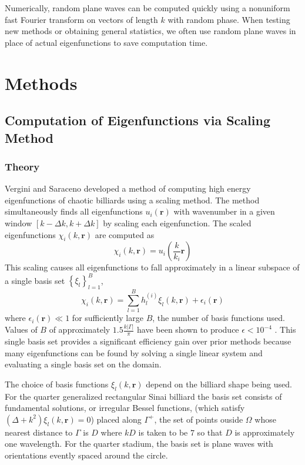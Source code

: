 \documentclass{report}
\newcommand{\rr}[0]{\mathbf{r}}
\begin{document}
Numerically, random plane waves can be computed quickly using a nonuniform fast Fourier transform on vectors of length $k$ with random phase. When testing new methods or obtaining general statistics, we often use random plane waves in place of actual eigenfunctions to save computation time.

\chapter{Methods}
\section{Computation of Eigenfunctions via Scaling Method}
\label{sec:scaling_method}
\subsection{Theory}
Vergini and Saraceno \cite{vergini} developed a method of computing high energy eigenfunctions of chaotic billiards using a scaling method. The method simultaneously finds all eigenfunctions $u_{i}(\rr)$ with wavenumber in a given window $[k - \Delta k, k + \Delta k]$ by scaling each eigenfunction. The scaled eigenfunctions $\chi_{i}(k, \rr)$ are computed as
\[
\chi_{i}(k, \rr) = u_{i} \left( \frac{k}{k_{i}} \rr \right)
\]
This scaling causes all eigenfunctions to fall approximately in a linear subspace of a single basis set $\left\{ \xi_{l} \right\}_{l=1}^{B}$,
\[
\chi_{i}(k, \rr) = \sum_{l=1}^{B} h_{l}^{(i)} \xi_{l}(k, \rr) + \epsilon_{i}(\rr)
\]
where $\epsilon_{i}(\rr) \ll 1$ for sufficiently large $B$, the number of basis functions used. Values of $B$ of approximately $1.5 \frac{k \vert \Gamma \vert}{\pi}$ have been shown to produce $\epsilon < 10^{-4}$ \cite{barnett_hassell}. This single basis set provides a significant efficiency gain over prior methods because many eigenfunctions can be found by solving a single linear system and evaluating a single basis set on the domain.

The choice of basis functions $\xi_{l}(k, \rr)$ depend on the billiard shape being used. For the quarter generalized rectangular Sinai billiard the basis set consists of fundamental solutions, or irregular Bessel functions, (which satisfy $(\Delta + k^2)\xi_{l}(k, \rr) = 0$) placed along $\Gamma^{+}$, the set of points ouside $\Omega$ whose nearest distance to $\Gamma$ is $D$ where $kD$ is taken to be $7$ so that $D$ is approximately one wavelength. For the quarter stadium, the basis set is plane waves with orientations evently spaced around the circle.
\end{document}
